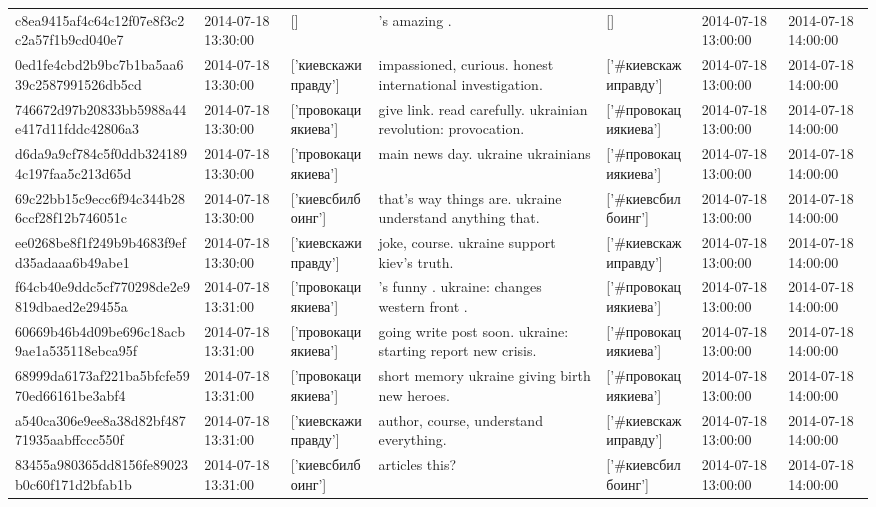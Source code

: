 \begin{tabular}{lllllll}
c8ea9415af4c64c12f07e8f3c2c2a57f1b9cd040e7 & 2014-07-18 13:30:00 & [] & 's amazing . & [] & 2014-07-18 13:00:00 & 2014-07-18 14:00:00 \\
0ed1fe4cbd2b9bc7b1ba5aa639c2587991526db5cd & 2014-07-18 13:30:00 & ['киевскажиправду'] & impassioned, curious. honest international investigation. & ['#киевскажиправду'] & 2014-07-18 13:00:00 & 2014-07-18 14:00:00 \\
746672d97b20833bb5988a44e417d11fddc42806a3 & 2014-07-18 13:30:00 & ['провокациякиева'] & give link. read carefully. ukrainian revolution: provocation. & ['#провокациякиева'] & 2014-07-18 13:00:00 & 2014-07-18 14:00:00 \\
d6da9a9cf784c5f0ddb3241894c197faa5c213d65d & 2014-07-18 13:30:00 & ['провокациякиева'] & main news day. ukraine ukrainians & ['#провокациякиева'] & 2014-07-18 13:00:00 & 2014-07-18 14:00:00 \\
69c22bb15c9ecc6f94c344b286ccf28f12b746051c & 2014-07-18 13:30:00 & ['киевсбилбоинг'] & that's way things are. ukraine understand anything that. & ['#киевсбилбоинг'] & 2014-07-18 13:00:00 & 2014-07-18 14:00:00 \\
ee0268be8f1f249b9b4683f9efd35adaaa6b49abe1 & 2014-07-18 13:30:00 & ['киевскажиправду'] & joke, course. ukraine support kiev's truth. & ['#киевскажиправду'] & 2014-07-18 13:00:00 & 2014-07-18 14:00:00 \\
f64cb40e9ddc5cf770298de2e9819dbaed2e29455a & 2014-07-18 13:31:00 & ['провокациякиева'] & 's funny . ukraine: changes western front . & ['#провокациякиева'] & 2014-07-18 13:00:00 & 2014-07-18 14:00:00 \\
60669b46b4d09be696c18acb9ae1a535118ebca95f & 2014-07-18 13:31:00 & ['провокациякиева'] & going write post soon. ukraine: starting report new crisis. & ['#провокациякиева'] & 2014-07-18 13:00:00 & 2014-07-18 14:00:00 \\
68999da6173af221ba5bfcfe5970ed66161be3abf4 & 2014-07-18 13:31:00 & ['провокациякиева'] & short memory ukraine giving birth new heroes. & ['#провокациякиева'] & 2014-07-18 13:00:00 & 2014-07-18 14:00:00 \\
a540ca306e9ee8a38d82bf48771935aabffccc550f & 2014-07-18 13:31:00 & ['киевскажиправду'] & author, course, understand everything. & ['#киевскажиправду'] & 2014-07-18 13:00:00 & 2014-07-18 14:00:00 \\
83455a980365dd8156fe89023b0c60f171d2bfab1b & 2014-07-18 13:31:00 & ['киевсбилбоинг'] & articles this? & ['#киевсбилбоинг'] & 2014-07-18 13:00:00 & 2014-07-18 14:00:00 \\

\end{tabular}
